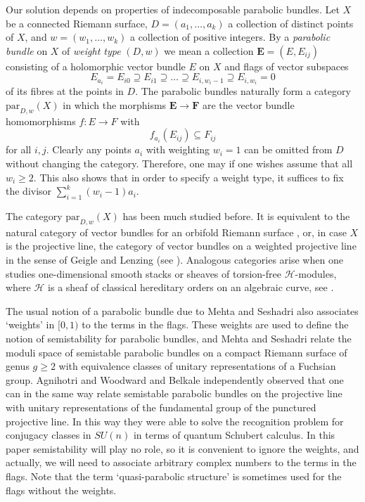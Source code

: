 \documentclass{amsart}
\theoremstyle{plain}
\theoremstyle{definition}
\theoremstyle{remark}
\newcommand{\E}{\mathbf{E}}
\begin{document}
Our solution depends on properties of indecomposable parabolic bundles.
Let $X$ be a connected Riemann surface, $D = (a_1,\dots,a_k)$ a collection
of distinct points of $X$, and $w=(w_1,\dots,w_k)$ a collection of positive integers.
By a \emph{parabolic bundle} on $X$ of \emph{weight type}
$(D,w)$ we mean a collection $\E = (E,E_{ij})$ consisting
of a holomorphic vector bundle $E$ on $X$
and flags of vector subspaces
\[
E_{a_i} = E_{i0} \supseteq E_{i1} \supseteq \dots \supseteq E_{i,w_i-1} \supseteq E_{i,w_i} = 0
\]
of its fibres at the points in $D$.
The parabolic bundles naturally form a category $\mathrm{par}_{D,w}(X)$ in which the
morphisms $\E\to \mathbf{F}$ are the vector bundle homomorphisms $f:E\to F$
with
\[
f_{a_i}(E_{ij}) \subseteq F_{ij}
\]
for all $i,j$. Clearly any points $a_i$ with weighting $w_i=1$ can be
omitted from $D$ without changing the category. Therefore, one may if one wishes
assume that all $w_i\ge 2$. This also shows that in order to specify a weight type,
it suffices to fix the divisor $\sum_{i=1}^k (w_i-1)a_i$.

The category $\mathrm{par}_{D,w}(X)$ has been much studied before.
It is equivalent to the natural category of vector bundles for an
orbifold Riemann surface \cite[Theorem 5.7]{FurSteer}, or,
in case $X$ is the projective line, the category of vector bundles
on a weighted projective line in the sense of Geigle and Lenzing \cite{GL}
(see \cite[Theorem 4.4]{Lenzing}). Analogous categories arise when
one studies one-dimensional smooth stacks or sheaves of torsion-free
$\mathcal{H}$-modules, where $\mathcal{H}$ is a sheaf of classical
hereditary orders on an algebraic curve, see \cite{CI}.

The usual notion of a parabolic bundle due to Mehta and Seshadri \cite{MS,Seshadri}
also associates `weights' in $[0,1)$ to the terms in the flags.
These weights are used to define the notion of semistability for parabolic bundles,
and Mehta and Seshadri relate the moduli space of semistable parabolic bundles on
a compact Riemann surface of genus $g\ge 2$ with
equivalence classes of unitary representations of a Fuchsian group.
Agnihotri and Woodward \cite{AW} and Belkale \cite{Belkale}
independently observed that one can in the same way relate semistable parabolic
bundles on the projective line with unitary representations of the
fundamental group of the punctured projective line. In this way they were
able to solve the recognition problem for conjugacy
classes in $SU(n)$ in terms of quantum Schubert calculus.
In this paper semistability will play no role, so it is convenient to ignore
the weights, and actually, we will need to associate arbitrary complex numbers to the
terms in the flags. Note that the term `quasi-parabolic structure' \cite{MS,Seshadri}
is sometimes used for the flags without the weights.
\end{document}
